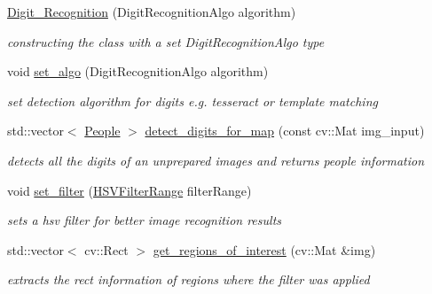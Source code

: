 \begin{DoxyCompactItemize}
\item 
\mbox{\hyperlink{class_digit___recognition_a183d686f4f9f3ce1ed555e9311d30f56}{Digit\+\_\+\+Recognition}} (Digit\+Recognition\+Algo algorithm)
\begin{DoxyCompactList}\small\item\em constructing the class with a set Digit\+Recognition\+Algo type \end{DoxyCompactList}\item 
\mbox{\label{class_digit___recognition_a5c83d879c6881693c3606cc5a1bc8ef2}} 
void \mbox{\hyperlink{class_digit___recognition_a5c83d879c6881693c3606cc5a1bc8ef2}{set\+\_\+algo}} (Digit\+Recognition\+Algo algorithm)
\begin{DoxyCompactList}\small\item\em set detection algorithm for digits e.\+g. tesseract or template matching \end{DoxyCompactList}\item 
\mbox{\label{class_digit___recognition_a1de0bde8afbfc939d0ae32092fc6cee4}} 
std\+::vector$<$ \mbox{\hyperlink{class_people}{People}} $>$ \mbox{\hyperlink{class_digit___recognition_a1de0bde8afbfc939d0ae32092fc6cee4}{detect\+\_\+digits\+\_\+for\+\_\+map}} (const cv\+::\+Mat img\+\_\+input)
\begin{DoxyCompactList}\small\item\em detects all the digits of an unprepared images and returns people information \end{DoxyCompactList}\item 
void \mbox{\hyperlink{class_digit___recognition_a68484f6730ee2f0fc2050726c3ff2252}{set\+\_\+filter}} (\mbox{\hyperlink{struct_h_s_v_filter_range}{H\+S\+V\+Filter\+Range}} filter\+Range)
\begin{DoxyCompactList}\small\item\em sets a hsv filter for better image recognition results \end{DoxyCompactList}\item 
std\+::vector$<$ cv\+::\+Rect $>$ \mbox{\hyperlink{class_digit___recognition_acb87e2fb3a72d625170ab8c95ef6828f}{get\+\_\+regions\+\_\+of\+\_\+interest}} (cv\+::\+Mat \&img)
\begin{DoxyCompactList}\small\item\em extracts the rect information of regions where the filter was applied \end{DoxyCompactList}\end{DoxyCompactItemize}
